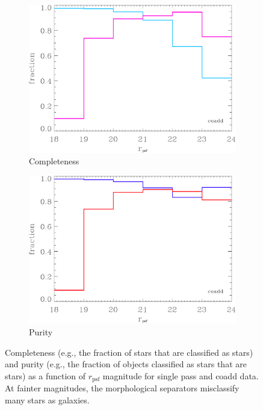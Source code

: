 \documentclass[12pt]{article}
\begin{document}
\begin{figure}[h!]
	\begin{subfigure}[]{0.49\textwidth}
		\includegraphics[width=\textwidth]{final_figures/coadd_completeness.eps}
		\caption{Completeness}
	\end{subfigure}
	\begin{subfigure}[]{0.49\textwidth}
		\includegraphics[width=\textwidth]{final_figures/coadd_purity.eps}
		\caption{Purity}
	\end{subfigure}
	\caption{Completeness (e.g., the fraction of stars that are classified as stars) and purity (e.g., the fraction of objects classified as stars that are stars) as a function of  $r_{\mathrm{psf}}$ magnitude for single pass and coadd data. At fainter magnitudes, the morphological separators misclassify many stars as galaxies.}
	\label{cp}
\end{figure}
\end{document}
